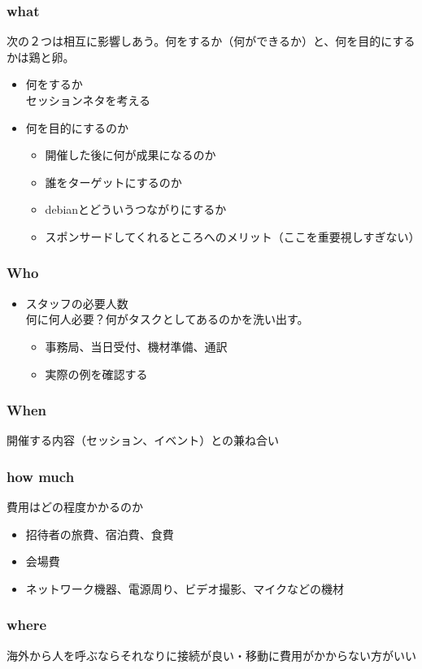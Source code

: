 \documentclass[mingoth,a4paper]{jsarticle}
\begin{document}
\subsubsection{what}
次の２つは相互に影響しあう。何をするか（何ができるか）と、何を目的にするかは鶏と卵。
\begin{itemize}
 \item 何をするか\\
       セッションネタを考える
 \item 何を目的にするのか
       \begin{itemize}
	\item 開催した後に何が成果になるのか
	\item 誰をターゲットにするのか
	\item debianとどういうつながりにするか
	\item スポンサードしてくれるところへのメリット（ここを重要視しすぎない）
       \end{itemize}
\end{itemize}
\subsubsection{Who}
\begin{itemize}
 \item スタッフの必要人数\\
       何に何人必要？何がタスクとしてあるのかを洗い出す。
 \begin{itemize}
  \item 事務局、当日受付、機材準備、通訳
  \item 実際の例を確認する
 \end{itemize}
\end{itemize}
\subsubsection{When}
開催する内容（セッション、イベント）との兼ね合い
\subsubsection{how much}
費用はどの程度かかるのか
\begin{itemize}
 \item 招待者の旅費、宿泊費、食費
 \item 会場費
 \item ネットワーク機器、電源周り、ビデオ撮影、マイクなどの機材
\end{itemize}
\subsubsection{where}
海外から人を呼ぶならそれなりに接続が良い・移動に費用がかからない方がいい
\end{document}
